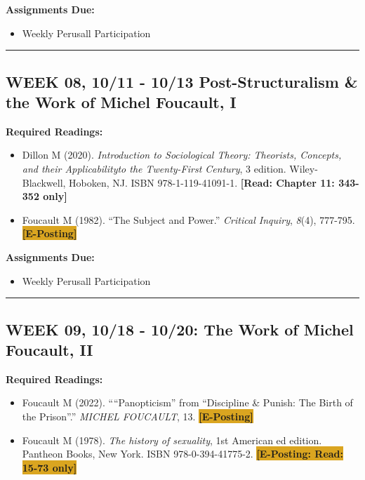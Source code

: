 \documentclass[11pt,]{article}
\providecommand{\tightlist}{%
  \setlength{\itemsep}{0pt}\setlength{\parskip}{0pt}}
\begin{document}
\textbf{Assignments Due:}

\begin{itemize}
\tightlist
\item
  Weekly Perusall Participation
\end{itemize}

\bigbreak
\hrule

\hypertarget{week-08-1011---1013-post-structuralism-the-work-of-michel-foucault-i}{%
\subsection{WEEK 08, 10/11 - 10/13 Post-Structuralism \& the Work of
Michel Foucault,
I}\label{week-08-1011---1013-post-structuralism-the-work-of-michel-foucault-i}}

\textbf{Required Readings:}

\begin{itemize}
\item
  Dillon M (2020). \emph{Introduction to Sociological Theory: Theorists,
  Concepts, and their Applicabilityto the Twenty-First Century}, 3
  edition. Wiley-Blackwell, Hoboken, NJ. ISBN 978-1-119-41091-1.
  \textcolor{BrickRed}{\bf{[Read: Chapter 11: 343-352 only]}}
\item
  Foucault M (1982). ``The Subject and Power.'' \emph{Critical Inquiry},
  \emph{8}(4), 777-795. \colorbox{Goldenrod}{\bf{[E-Posting]}}
\end{itemize}

\textbf{Assignments Due:}

\begin{itemize}
\tightlist
\item
  Weekly Perusall Participation
\end{itemize}

\bigbreak
\hrule

\hypertarget{week-09-1018---1020-the-work-of-michel-foucault-ii}{%
\subsection{WEEK 09, 10/18 - 10/20: The Work of Michel Foucault,
II}\label{week-09-1018---1020-the-work-of-michel-foucault-ii}}

\textbf{Required Readings:}

\begin{itemize}
\item
  Foucault M (2022). ````Panopticism'' from ``Discipline \& Punish: The
  Birth of the Prison''.'' \emph{MICHEL FOUCAULT}, 13.
  \colorbox{Goldenrod}{\bf{[E-Posting]}}
\item
  Foucault M (1978). \emph{The history of sexuality}, 1st American ed
  edition. Pantheon Books, New York. ISBN 978-0-394-41775-2.
  \colorbox{Goldenrod}{\bf{[E-Posting: Read: 15-73 only]}}
\end{itemize}
\end{document}
